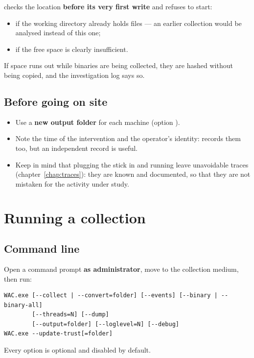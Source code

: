 \documentclass[11pt,a4paper,oneside]{report}
\begin{document}
\wac{} checks the location \textbf{before its very first write} and refuses to
start:
\begin{itemize}
  \item if the working directory already holds files — an earlier collection
        would be analysed instead of this one;
  \item if the free space is clearly insufficient.
\end{itemize}
If space runs out while binaries are being collected, they are hashed without
being copied, and the investigation log says so.

\section{Before going on site}

\begin{itemize}
  \item Use a \textbf{new output folder} for each machine (option
        ).
  \item Note the time of the intervention and the operator's identity: \wac{}
        records them too, but an independent record is useful.
  \item Keep in mind that plugging the stick in and running \wac{} leave
        unavoidable traces (chapter~\ref{chap:traces}): they are known and
        documented, so that they are not mistaken for the activity under
        study.
\end{itemize}

\chapter{Running a collection}

\section{Command line}

Open a command prompt \textbf{as administrator}, move to the collection medium,
then run:

\begin{lstlisting}
WAC.exe [--collect | --convert=folder] [--events] [--binary | --binary-all]
        [--threads=N] [--dump]
        [--output=folder] [--loglevel=N] [--debug]
WAC.exe --update-trust[=folder]
\end{lstlisting}

Every option is optional and disabled by default.
\end{document}
